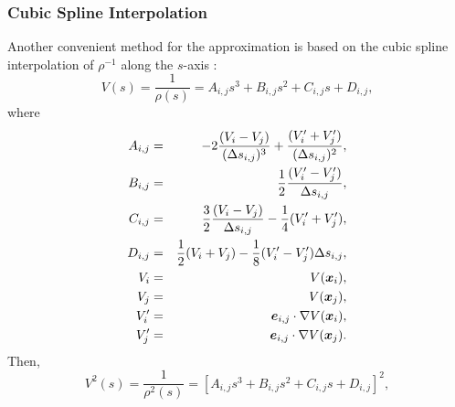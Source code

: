\documentclass{cjour}
\newcommand{ \Vec   }[1]{ \mbox{\boldmath $ #1 $} }
\begin{document}
\begin{article}
\subsubsection{Cubic Spline Interpolation}
                                                     \label{Sec:Spline}
Another convenient method for the approximation is 
based on the cubic spline interpolation of $\rho^{-1}$ 
along the $s$-axis : 
\begin{equation}
       V(s) =  \frac{1}{\rho(s)} = 
                   A_{i,j} s^3 + B_{i,j} s^2 + C_{i,j} s + D_{i,j} , 
                                                        \label{eq:VsS}
\end{equation}
where 
\begin{eqnarray}
 A_{i,j} & = &          -2 \frac{( V _i - V _j )}{(\Delta s_{i,j})^3}
                         + \frac{( V'_i + V'_j )}{(\Delta s_{i,j})^2},
                                                            \nonumber \\
 B_{i,j} & = & \frac{1}{2} \frac{( V'_i - V'_j )}{ \Delta s_{i,j}   },
                                                            \nonumber \\
 C_{i,j} & = & \frac{3}{2} \frac{( V _i - V _j )}{ \Delta s_{i,j}   }  
             - \frac{1}{4}       ( V'_i + V'_j )                     ,
                                                            \nonumber \\
 D_{i,j} & = & \frac{1}{2}       ( V _i + V _j ) 
             - \frac{1}{8}       ( V'_i - V'_j )   \Delta s_{i,j}    ,
                                                            \nonumber \\
    V_i  & = & V(\Vec{x}_i)  ,
                                                            \nonumber \\
    V_j  & = & V(\Vec{x}_j)  , 
                                                            \nonumber \\
    V_i' & = & \Vec{e}_{i,j} \cdot \nabla V(\Vec{x}_i) ,
                                                            \nonumber \\
    V_j' & = & \Vec{e}_{i,j} \cdot \nabla V(\Vec{x}_j) .
\end{eqnarray}
Then, 
\begin{equation}
       V^2(s) = \frac{1}{\rho^{2}(s)} = 
                \left[
                 A_{i,j} s^3 + B_{i,j} s^2 + C_{i,j} s + D_{i,j}
                \right]^2 , 

\end{equation}
\end{article}
\end{document}

